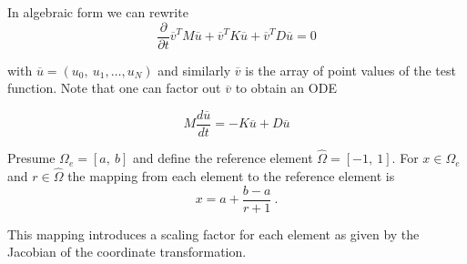 \documentclass[10pt]{article}
\begin{document}
{In algebraic form we can rewrite
\begin{equation}
\frac{\partial}{\partial t}\overline{v}^TM\overline{u} + \overline{v}^TK\overline{u}+\overline{v}^TD\overline{u}=0
\end{equation}

with $\overline{u}=(u_0,\ u_1, \ldots, u_N)$ and similarly $\overline v$ is the array of point values of the test function. 
Note that one can factor out $\overline v$ to obtain an ODE

\begin{equation}
M\frac{d \overline{u}}{d t} =- K \overline{u}+ D \overline{u} \label{eq:discrete}
\end{equation}

Presume  $\Omega_e = [a, \ b]$ and define the reference element $\hat{\Omega} = [-1, \ 1]$.
For $x\in \Omega_e$ and $r \in \hat{\Omega}$ the mapping from each element to the reference element is
$$x= a+ \frac{b-a}{r+1}\ .$$

This mapping introduces a scaling factor for each element as given by the Jacobian of the coordinate transformation.




}
\end{document}
